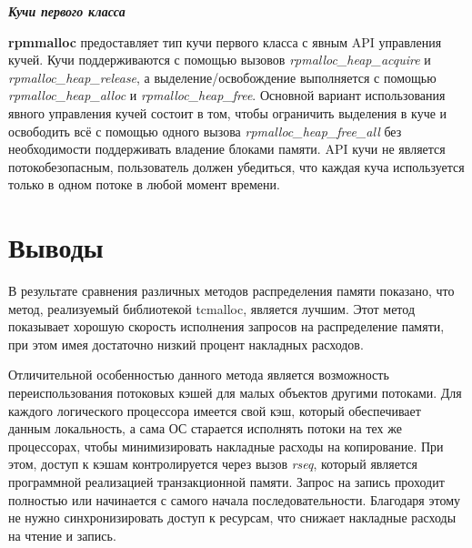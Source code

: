 \bigbreak
\textit{\textbf{Кучи первого класса}}

\textbf{rpmmalloc} предоставляет тип кучи первого класса с явным API управления кучей. Кучи поддерживаются с помощью вызовов \textit{rpmalloc\_heap\_acquire} и \textit{rpmalloc\_heap\_release}, а выделение/освобождение выполняется с помощью \textit{rpmalloc\_heap\_alloc} и \textit{rpmalloc\_heap\_free}. Основной вариант использования явного управления кучей состоит в том, чтобы ограничить выделения в куче и освободить всё с помощью одного вызова \textit{rpmalloc\_heap\_free\_all} без необходимости поддерживать владение блоками памяти. API кучи не является потокобезопасным, пользователь должен убедиться, что каждая куча используется только в одном потоке в любой момент времени.

\section{Выводы}
В результате сравнения различных методов распределения памяти показано, что метод, реализуемый библиотекой tcmalloc, является лучшим. Этот метод показывает хорошую скорость исполнения запросов на распределение памяти, при этом имея достаточно низкий процент накладных расходов.

Отличительной особенностью данного метода является возможность переиспользования потоковых кэшей для малых объектов другими потоками. Для каждого логического процессора имеется свой кэш, который обеспечивает данным локальность, а сама ОС старается исполнять потоки на тех же процессорах, чтобы минимизировать накладные расходы на копирование. При этом, доступ к кэшам контролируется через вызов \textit{rseq}, который является программной реализацией транзакционной памяти. Запрос на запись проходит полностью или начинается с самого начала последовательности. Благодаря этому не нужно синхронизировать доступ к ресурсам, что снижает накладные расходы на чтение и запись.

